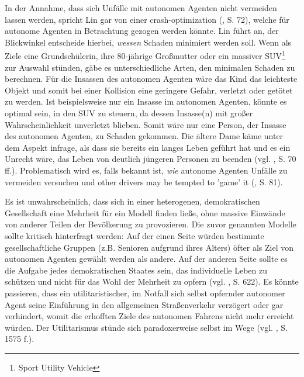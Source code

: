 \documentclass[a4paper, 12pt, titlepage]{scrartcl}
\begin{document}
	In der Annahme, dass sich Unf\"alle mit autonomen Agenten nicht vermeiden lassen werden, spricht Lin \autocite{Lin2015} gar von einer \glqq crash-optimization\grqq{} (\autocite{Lin2015}, S. 72), welche f\"ur autonome Agenten in Betrachtung gezogen werden k\"onnte. Lin \autocite{Lin2015} f\"uhrt an, der Blickwinkel entscheide hierbei, \emph{wessen} Schaden minimiert werden soll. Wenn als \glqq Ziele\grqq{} eine Grundsch\"ulerin, ihre 80-j\"ahrige Gro\ss mutter oder ein massiver SUV\footnote{Sport Utility Vehicle} zur Auswahl st\"unden, g\"abe es unterschiedliche Arten, den minimalen Schaden zu berechnen. F\"ur die Insassen des autonomen Agenten w\"are das Kind das leichteste Objekt und somit bei einer Kollision eine geringere Gefahr, verletzt oder get\"otet zu werden. Ist beispielsweise nur ein Insasse im autonomen Agenten, k\"onnte es optimal sein, in den SUV zu steuern, da dessen Insasse(n) mit gro\ss er Wahrscheinlichkeit unverletzt blieben. Somit w\"are nur eine Person, der Insasse des autonomen Agenten, zu Schaden gekommen. Die \"altere Dame k\"ame unter dem Aspekt infrage, als dass sie bereits ein langes Leben gef\"uhrt hat und es ein Unrecht w\"are, das Leben von deutlich j\"ungeren Personen zu beenden (vgl. \autocite{Lin2015}, S. 70 ff.). Problematisch wird es, falls bekannt ist, \emph{wie} autonome Agenten Unf\"alle zu vermeiden versuchen und \glqq other drivers may be tempted to 'game' it\grqq{} (\autocite{Lin2015}, S. 81). 
	
	Es ist unwahrscheinlich, dass sich in einer heterogenen, demokratischen Gesellschaft eine Mehrheit f\"ur ein Modell finden lie\ss e, ohne massive Einw\"ande von anderer Teilen der Bev\"olkerung zu provozieren. Die zuvor genannten Modelle sollte kritisch hinterfragt werden: Auf der einen Seite w\"urden bestimmte gesellschaftliche Gruppen (z.B. Senioren aufgrund ihres Alters) \"ofter als \glqq Ziel\grqq{} von autonomen Agenten gew\"ahlt werden als andere. Auf der anderen Seite sollte es die Aufgabe jedes demokratischen Staates sein, das individuelle Leben zu sch\"utzen und nicht f\"ur das Wohl der Mehrheit zu opfern (vgl. \autocite{Hevelke2015}, S. 622). Es k\"onnte passieren, dass ein utilitaristischer, im Notfall sich selbst opfernder autonomer Agent seine Einf\"uhrung in den allgemeinen Stra\ss enverkehr verz\"ogert oder gar verhindert, womit die erhofften Ziele des autonomen Fahrens nicht mehr erreicht w\"urden. Der Utilitarismus st\"unde sich paradoxerweise selbst im Wege (vgl. \autocite{Bonnefon1573}, S. 1575 f.).
\end{document}
